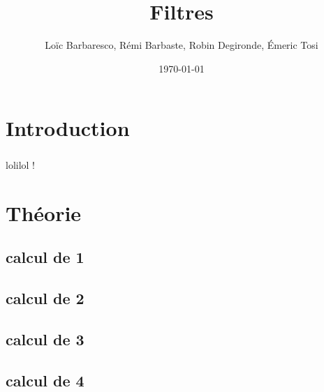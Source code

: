 \documentclass[a4paper,11pt]{report}
\title{Filtres}
\author{Loïc Barbaresco, Rémi Barbaste, Robin Degironde, Émeric Tosi}
\date{\today}
\begin{document}
    \maketitle{}

    \setcounter{tocdepth}{1} %
    \renewcommand{\contentsname}{Sommaire} %
    \tableofcontents{} %
    \clearpage



\chapter{Introduction}
        \paragraph{}
lolilol !

\chapter{Théorie}
    \section{calcul de 1}
        \paragraph{}

    \section{calcul de 2}
        \paragraph{}

    \section{calcul de 3}
        \paragraph{}

    \section{calcul de 4}
\end{document}
